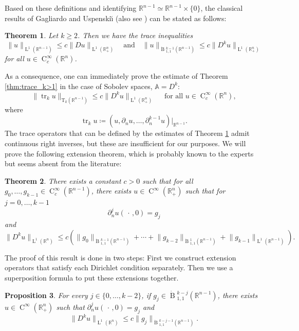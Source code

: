 \documentclass[a4paper,10pt]{amsart}
\newcommand{\R}{\mathbb R}
\renewcommand{\leq}{\leqslant}
\DeclareMathOperator{\tr}{tr}
\newcommand{\lebe}{\operatorname{L}}
\newcommand{\hold}{\operatorname{C}}
\newcommand{\A}{\mathbb{A}}
\newcommand{\besov}{\operatorname{B}}
\numberwithin{equation}{section}
\newtheorem{theorem}{Theorem}[section]
\newtheorem{proposition}[theorem]{Proposition}
\theoremstyle{remark}
\numberwithin{equation}{section}
\begin{document}
	
	Based on these definitions and identifying $\R^{n-1}\simeq\R^{n-1}\times\{0\}$, the classical results of Gagliardo \cite{Gag} and Uspenski\u{\i} \cite{Uspenskii} (also see \cite{MR,Mironescu_2015}) can be stated as follows:
	\begin{theorem}\label{thm:gag+usp}
		Let $k\geq 2$. Then we have the trace inequalities
		$$
		\|u\|_{\lebe^1(\R^{n-1})}\leq c\|Du\|_{\lebe^1(\R^n_+)}\quad\text{and}\quad\| u\|_{\dot{\besov}{^{k-1}_{1,1}}(\R^{n-1})}\leq c\|D^ku\|_{\lebe^1(\R^n_+)}
		$$
		for all $u\in\hold^\infty_c(\R^n)$.
	\end{theorem}
	As a consequence, one can immediately prove the estimate of Theorem \ref{thm:trace_k>1} in the case of Sobolev spaces, $\A=D^k$:
	$$
	\|\tr_k u\|_{\mathrm T_k(\R^{n-1})}\leq c\|D^k u\|_{\lebe^1(\R^n_+)} \quad\text{ for all }u\in\hold^\infty_c(\R^n), 
	$$
	where $$
	\tr_k u\coloneqq(u,\partial_n u,\ldots,\partial_n^{k-1}u)\big|_{\R^{n-1}}.
	$$
	The trace operators that can be defined by the estimates of Theorem \ref{thm:gag+usp} admit continuous right inverses, but these are insufficient for our purposes. We will prove the following extension theorem, which is probably known to the experts but seems absent from the literature:
	\begin{theorem}\label{thm:extension_many_derivatives}
		There exists a constant \(c>0\) such that for all \(g_0, \dotsc, g_{k - 1} \in \hold^\infty_c (\R^{n - 1})\), there exists  \(u \in \hold^\infty (\R^n_+)\) such that for \(j = 0, \dotsc, k - 1\)
		\begin{equation*}
			\partial_n^j u (\,\cdot\,, 0) = g_j
		\end{equation*}
		and 
		\begin{equation*}
			\lVert D^k u \rVert_{\lebe^1 (\R^n)}
			\leq c\left( \lVert g_0 \rVert_{\dot{\besov}{^{k-1}_{1,1}}(\R^{n - 1})}
			+ \dotsb 
			+ \lVert g_{k - 2} \rVert_{\dot{\besov}{^{1}_{1,1}}(\R^{n - 1})} 
			+ \lVert g_{k - 1} \rVert_{\lebe^1 (\R^{n - 1})}\right). 
		\end{equation*}
	\end{theorem}
	The proof of this result is done in two steps: First we construct extension operators that satisfy each Dirichlet condition separately. Then we use a superposition formula to put these extensions together. 
	\begin{proposition}
		\label{proposition_extension_besov}
		For every \(j \in \{0, \dotsc, k - 2\}\), if \(g_j \in \dot{\besov}{^{k - j}_{1,1}}(\R^{n - 1})\), there exists \(u \in \hold^\infty (\R^n_+)\) such that \(\partial_n^j u (\,\cdot\,, 0) = g_j\) and 
		\begin{equation*}
			\lVert D^k u \rVert_{\lebe^1 (\R^n)}
			\leq c\lVert g_j \rVert_{\dot{\besov}{^{k-j - 1}_{1,1}}(\R^{n - 1})}. 
		\end{equation*}
	\end{proposition}
\end{document}
